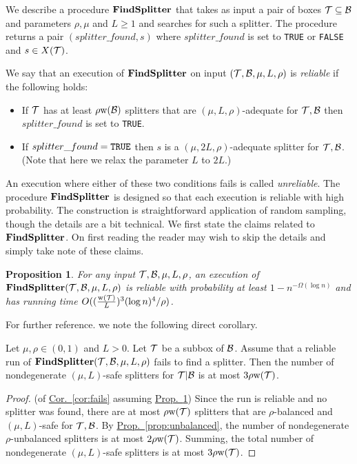 \documentclass{acmsmall}
\newtheorem{prop}[theorem]{Proposition}
\newcommand{\cB}{{\cal B}}
\newcommand{\cT}{{\cal T}}
\newcommand{\Prop}[1]{\hyperref[prop:#1]{Prop.~\ref*{prop:#1}}} %
\newcommand{\Cor}[1]{\hyperref[cor:#1]{Cor.~\ref*{cor:#1}}} %
\newcommand{\strip}[2]{#1|#2}
\newcommand{\width}{{\bf {\rm  w}}}
\newcommand{\findsplitter}{{\rm {\bf FindSplitter}}}
\newcommand{\splitterfound}{splitter\_found}
\begin{document}
We describe a procedure $\findsplitter$ that takes as input
a pair of boxes $\cT \subseteq \cB$  and parameters $\rho,\mu$ and $L \geq 1$ and
searches for such a splitter. The procedure
returns a pair $(\splitterfound, s)$
where $\splitterfound$ is set to {\tt TRUE} or {\tt FALSE}  
and $s \in X(\cT)$.

We say that an execution
of  $\findsplitter$ on input $(\cT,\cB,\mu,L,\rho)$ is 
{\em reliable} if the following holds:
%
\begin{itemize}
\item If $\cT$ has at least $\rho \width(\cB)$ splitters that are $(\mu,L,\rho)$-adequate  for $\cT,\cB$ then $\splitterfound$
is set to {\tt TRUE}.
\item If $\splitterfound={\tt TRUE}$ then $s$ is a $(\mu,2L,\rho)$-adequate splitter for $\cT,\cB$.  (Note that here
we relax the parameter $L$ to  $2L$.)
\end{itemize}
%
An execution where either of these two conditions fails is called {\em unreliable}. 
The procedure $\findsplitter$ is designed so that each execution
is reliable with high probability. The construction  is  straightforward application of
random sampling, though the details are a bit technical. We first state the claims related to $\findsplitter$.
On first reading the reader may wish to skip the details and simply take note of these claims.

\begin{prop}
\label{prop:splitter}
For any input $\cT,\cB,\mu,L,\rho$, an execution of $\findsplitter(\cT,\cB,\mu,L,\rho)$ is reliable with probability at least $1-n^{-\Omega(\log n)}$
and has running time $O((\frac{\width(\cT)}{L})^3(\log n)^4/\rho)$.
\end{prop}

For further reference. we note the following direct corollary.

\begin{corollary}
\label{cor:fails}
Let $\mu,\rho \in (0,1)$ and $L>0$.
Let $\cT$ be a subbox of $\cB$. 
Assume that a reliable run of $\findsplitter(\cT,\cB,\mu,L,\rho)$ fails to find a splitter.
Then the number of nondegenerate $(\mu,L)$-safe splitters for $\strip{\cT}{\cB}$ is at most $3\rho\width(\cT)$. 
\end{corollary}

\begin{proof} (of \Cor{fails} assuming  \Prop{splitter}) 
Since the run is reliable and no splitter was found, there are at most $\rho \width(\cT)$
splitters that are $\rho$-balanced and $(\mu,L)$-safe for $\cT,\cB$. By  \Prop{unbalanced},
the number of nondegenerate $\rho$-unbalanced splitters is at most $2\rho \width(\cT)$.  Summing, the total
number of nondegenerate $(\mu,L)$-safe splitters is at most $3\rho \width(\cT)$.
\end{proof}
\end{document}
